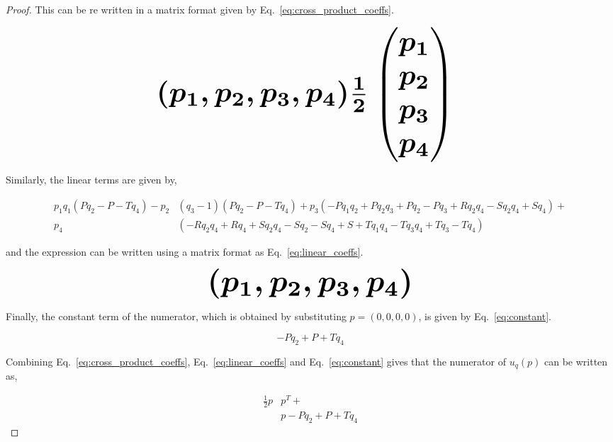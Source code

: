 \documentclass[10pt]{article}
\begin{document}
\begin{proof}
    This can be re written in a matrix format given by
    Eq.~\ref{eq:cross_product_coeffs}.
    
    \begin{equation}\label{eq:cross_product_coeffs}
        \resizebox{0.9\linewidth}{!}{\arraycolsep=2.5pt%
        \boldmath\( 
        (p_1, p_2, p_3, p_4) \frac{1}{2}  \begin{pmatrix} 
        p_1 \\
        p_2 \\
        p_3 \\
        p_4 \end{pmatrix}
        \) }
    \end{equation}
    
    Similarly, the linear terms are given by,
    
    \begingroup
    \footnotesize
    \begin{align*}
    p_{1} q_{1} (P q_{2} - P - T q_{4}) - p_{2} & (q_{3} - 1) (P q_{2} - P - T q_{4}) + p_{3} (- P q_{1} q_{2} + P q_{2} q_{3} + P q_{2} - P q_{3} + R q_{2} q_{4} - S q_{2} q_{4} + S q_{4}) + \\
    p_{4} & (- R q_{2} q_{4} + R q_{4} + S q_{2} q_{4} - S q_{2} - S q_{4} + S + T q_{1} q_{4} - T q_{3} q_{4} + T q_{3} - T q_{4})
    \end{align*}
    \endgroup
    
    and the expression can be written using a matrix format as
    Eq.~\ref{eq:linear_coeffs}.
    
    \begin{equation}\label{eq:linear_coeffs}
        \resizebox{0.60\linewidth}{!}{\arraycolsep=2.5pt%
        \boldmath\(
        (p_1, p_2, p_3, p_4) \)}
    \end{equation}
    
    Finally, the constant term of the numerator, which is obtained by
    substituting $p=(0, 0, 0, 0)$, is given by Eq.~\ref{eq:constant}.
    
    \begin{equation}\label{eq:constant}
    - P q_{2} + P + T q_{4}
    \end{equation}
    
    Combining Eq.~\ref{eq:cross_product_coeffs}, Eq.~\ref{eq:linear_coeffs} and
    Eq.~\ref{eq:constant} gives that the numerator of \(u_q(p)\) can be written
    as,
    
    \begingroup
    \tiny\boldmath
    \begin{align*}
        \frac{1}{2}p &  p^T +  \\
        &  p - P q_{2} + P + T q_{4}
    \end{align*}
    \endgroup
    

\end{proof}
\end{document}
